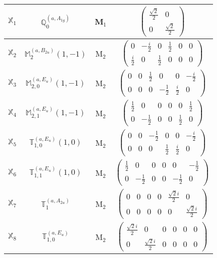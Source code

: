 \documentclass[fleqn,10pt,landscape]{article}
\begin{document}
\begin{itemize}
\begin{center}
\begin{longtable}{c|c|c|c}
$ \mathbb{X}_{1} $ & $\mathbb{Q}_{0}^{(a,A_{1g})}$ & M$_{1}$ & $\begin{pmatrix} \frac{\sqrt{2}}{2} & 0 \\ 0 & \frac{\sqrt{2}}{2} \end{pmatrix}$ \\ \hline
$ \mathbb{X}_{2} $ & $\mathbb{M}_{2}^{(a,B_{2u})}(1,-1)$ & M$_{2}$ & $\begin{pmatrix} 0 & - \frac{i}{2} & 0 & \frac{1}{2} & 0 & 0 \\ \frac{i}{2} & 0 & \frac{1}{2} & 0 & 0 & 0 \end{pmatrix}$ \\
$ \mathbb{X}_{3} $ & $\mathbb{M}_{2,0}^{(a,E_{u})}(1,-1)$ & M$_{2}$ & $\begin{pmatrix} 0 & 0 & \frac{1}{2} & 0 & 0 & - \frac{i}{2} \\ 0 & 0 & 0 & - \frac{1}{2} & \frac{i}{2} & 0 \end{pmatrix}$ \\
$ \mathbb{X}_{4} $ & $\mathbb{M}_{2,1}^{(a,E_{u})}(1,-1)$ & M$_{2}$ & $\begin{pmatrix} \frac{1}{2} & 0 & 0 & 0 & 0 & \frac{1}{2} \\ 0 & - \frac{1}{2} & 0 & 0 & \frac{1}{2} & 0 \end{pmatrix}$ \\
$ \mathbb{X}_{5} $ & $\mathbb{T}_{1,0}^{(a,E_{u})}(1,0)$ & M$_{2}$ & $\begin{pmatrix} 0 & 0 & - \frac{1}{2} & 0 & 0 & - \frac{i}{2} \\ 0 & 0 & 0 & \frac{1}{2} & \frac{i}{2} & 0 \end{pmatrix}$ \\
$ \mathbb{X}_{6} $ & $\mathbb{T}_{1,1}^{(a,E_{u})}(1,0)$ & M$_{2}$ & $\begin{pmatrix} \frac{1}{2} & 0 & 0 & 0 & 0 & - \frac{1}{2} \\ 0 & - \frac{1}{2} & 0 & 0 & - \frac{1}{2} & 0 \end{pmatrix}$ \\
$ \mathbb{X}_{7} $ & $\mathbb{T}_{1}^{(a,A_{2u})}$ & M$_{2}$ & $\begin{pmatrix} 0 & 0 & 0 & 0 & \frac{\sqrt{2} i}{2} & 0 \\ 0 & 0 & 0 & 0 & 0 & \frac{\sqrt{2} i}{2} \end{pmatrix}$ \\
$ \mathbb{X}_{8} $ & $\mathbb{T}_{1,0}^{(a,E_{u})}$ & M$_{2}$ & $\begin{pmatrix} \frac{\sqrt{2} i}{2} & 0 & 0 & 0 & 0 & 0 \\ 0 & \frac{\sqrt{2} i}{2} & 0 & 0 & 0 & 0 \end{pmatrix}$ \\

\end{longtable}
\end{center}
\end{itemize}
\end{document}
